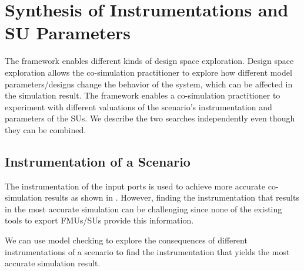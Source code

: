 
\section{Synthesis of Instrumentations and SU Parameters}\label{sc:DSE}
The framework enables different kinds of design space exploration.
Design space exploration allows the co-simulation practitioner to explore how different model parameters/designs change the behavior of the system, which can be affected in the simulation result.
The framework enables a co-simulation practitioner to experiment with different valuations of the scenario's instrumentation and parameters of the SUs.
We describe the two searches independently even though they can be combined.

\subsection{Instrumentation of a Scenario}
The instrumentation of the input ports is used to achieve more accurate co-simulation results as shown in \cite{Gomes2019,Oakes2021,hansen_verification_2021}.
However, finding the instrumentation that results in the most accurate simulation can be challenging since none of the existing tools to export FMUs/SUs provide this information.

We can use model checking to explore the consequences of different instrumentations of a scenario to find the instrumentation that yields the most accurate simulation result.

